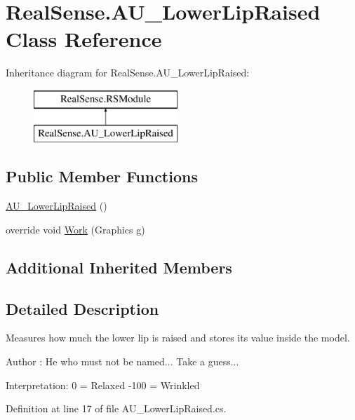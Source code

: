 \hypertarget{class_real_sense_1_1_a_u___lower_lip_raised}{}\section{Real\+Sense.\+A\+U\+\_\+\+Lower\+Lip\+Raised Class Reference}
\label{class_real_sense_1_1_a_u___lower_lip_raised}
Inheritance diagram for Real\+Sense.\+A\+U\+\_\+\+Lower\+Lip\+Raised\+:\begin{figure}[H]
\begin{center}
\leavevmode
\includegraphics[height=2.000000cm]{class_real_sense_1_1_a_u___lower_lip_raised}
\end{center}
\end{figure}
\subsection*{Public Member Functions}
\begin{DoxyCompactItemize}
\item 
\hyperlink{class_real_sense_1_1_a_u___lower_lip_raised_aae4c2bb8b4a75fcfc59867f1950f823a}{A\+U\+\_\+\+Lower\+Lip\+Raised} ()
\item 
override void \hyperlink{class_real_sense_1_1_a_u___lower_lip_raised_aa3949d4b7a3adf5d38cb5ad5acd5c8f2}{Work} (Graphics g)
\end{DoxyCompactItemize}
\subsection*{Additional Inherited Members}


\subsection{Detailed Description}
Measures how much the lower lip is raised and stores its\textquotesingle{} value inside the model. \begin{DoxyAuthor}{Author}
\+: He who must not be named...  Take a guess...
\end{DoxyAuthor}
Interpretation\+: 0 = Relaxed -\/100 = Wrinkled 

Definition at line 17 of file A\+U\+\_\+\+Lower\+Lip\+Raised.\+cs.



